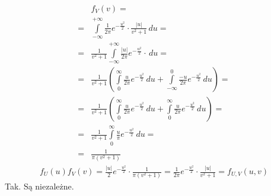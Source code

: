 \begin{align*}
&f_V(v)
=\\=&
\int\limits_{-\infty }^{+\infty }
\frac{1}{2 \pi }e^{-\frac{u^2}{2}}\cdot\frac{|u|}{v^2+1}\,du
=\\=&
\frac{1}{v^2+1}\int\limits_{-\infty }^{+\infty }
\frac{|u|}{2 \pi }e^{-\frac{u^2}{2}}\cdot\,du
=\\=&
\frac{1}{v^2+1}
\left(\int\limits_{0}^{\infty}
\frac{u}{2 \pi }e^{-\frac{u^2}{2}}\,du
+
\int\limits_{-\infty }^{0}
\frac{-u}{2 \pi }e^{-\frac{u^2}{2}}\,du\right)
=\\=&
\frac{1}{v^2+1}
\left(\int\limits_{0}^{\infty}
\frac{u}{2 \pi }e^{-\frac{u^2}{2}}\,du
+
\int\limits_{0}^{\infty}
\frac{u}{2 \pi }e^{-\frac{u^2}{2}}\,du\right)
=\\=&
\frac{1}{v^2+1}\int\limits_{0}^{\infty}
\frac{u}{\pi }e^{-\frac{u^2}{2}}\,du
=\\=&
\frac{1}{\pi (v^2+1)}
\end{align*}
\begin{gather*}
f_U(u)f_V(v)=
\frac{|u|}{2 }e^{-\frac{u^2}{2}}\cdot
\frac{1}{\pi (v^2+1)}=
\frac{1}{2 \pi }e^{-\frac{u^2}{2}}\cdot\frac{|u|}{v^2+1}=
f_{U,V}(u,v)
\end{gather*}
Tak. Są niezależne.